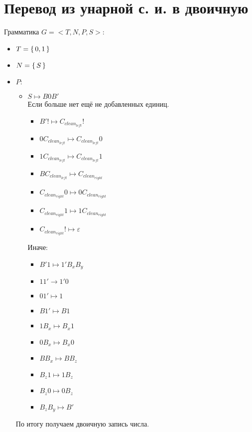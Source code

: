 \section{Перевод из унарной с. и. в двоичную}
Грамматика $G = <T, N, P, S>$:
\begin{itemize}
    \item $T = \set{0, 1}$
    \item $N = \set{S}$
    \item $P\colon$
        \begin{itemize}
            \item $S \mapsto B0B'$ \\
                Если больше нет ещё не добавленных единиц.
                \begin{itemize}
                    \item $B'! \mapsto C_{clean_{left}}!$
                    \item $0 C_{clean_{left}} \mapsto C_{clean_{left}} 0$ 
                    \item $1 C_{clean_{left}} \mapsto C_{clean_{left}} 1$ 
                    \item $B C_{clean_{left}} \mapsto C_{clean_{right}}$
                    \item $C_{clean_{right}}0 \mapsto 0C_{clean_{right}}$
                    \item $C_{clean_{right}}1 \mapsto 1C_{clean_{right}}$
                    \item $C_{clean_{right}}! \mapsto \varepsilon$
                \end{itemize}
                Иначе:
                \begin{itemize}
                    \item $B'1 \mapsto 1' B_{x}B_{y}$
                    \item $11' \rightarrow 1'0$
                    \item $01' \mapsto 1$
                    \item $B1' \mapsto B 1$
                    \item $1 B_{x} \mapsto B_{x} 1$
                    \item $0 B_{x} \mapsto B_{x} 0$
                    \item $BB_{x} \mapsto B B_{z}$
                    \item $B_{z} 1 \mapsto 1 B_{z}$
                    \item $B_{z} 0 \mapsto 0 B_{z}$
                    \item $B_{z} B_{y} \mapsto B'$
                \end{itemize}
        \end{itemize}
        По итогу получаем двоичную запись числа.
\end{itemize}
